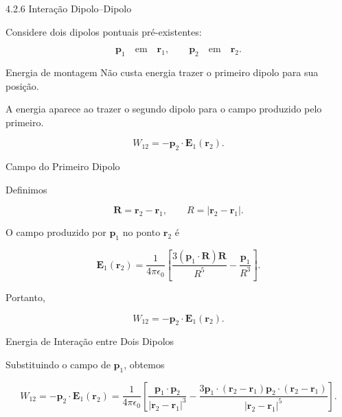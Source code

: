 \documentclass[aspectratio=169]{beamer}
\begin{document}
\begin{frame}{4.2.6 Interação Dipolo--Dipolo}

Considere dois dipolos pontuais pré-existentes:

\[
\mathbf p_1 \quad \text{em} \quad \mathbf r_1,
\qquad
\mathbf p_2 \quad \text{em} \quad \mathbf r_2.
\]

\begin{mybox}{Energia de montagem}
Não custa energia trazer o primeiro dipolo para sua posição.

A energia aparece ao trazer o segundo dipolo para o campo produzido pelo primeiro.
\end{mybox}

\begin{equation}
W_{12}
=
-\mathbf p_2\cdot \mathbf E_1(\mathbf r_2).
\end{equation}

\end{frame}

\begin{frame}{Campo do Primeiro Dipolo}

Definimos

\begin{equation}
\mathbf R
=
\mathbf r_2-\mathbf r_1,
\qquad
R=
|\mathbf r_2-\mathbf r_1|.
\end{equation}

O campo produzido por \(\mathbf p_1\) no ponto \(\mathbf r_2\) é

\begin{equation}
\mathbf E_1(\mathbf r_2)
=
\frac{1}{4\pi\epsilon_0}
\left[
\frac{3(\mathbf p_1\cdot \mathbf R)\mathbf R}{R^5}
-
\frac{\mathbf p_1}{R^3}
\right].
\end{equation}

Portanto,

\begin{equation}
W_{12}
=
-\mathbf p_2\cdot \mathbf E_1(\mathbf r_2).
\end{equation}

\end{frame}

\begin{frame}{Energia de Interação entre Dois Dipolos}

Substituindo o campo de \(\mathbf p_1\), obtemos

\begin{eqbox}
\begin{equation}
W_{12}
=
-\mathbf p_2\cdot \mathbf E_1(\mathbf r_2)
=
\frac{1}{4\pi\epsilon_0}
\left[
\frac{\mathbf p_1\cdot \mathbf p_2}{|\mathbf r_2-\mathbf r_1|^3}
-
\frac{
3\mathbf p_1\cdot(\mathbf r_2-\mathbf r_1)
\mathbf p_2\cdot(\mathbf r_2-\mathbf r_1)
}
{|\mathbf r_2-\mathbf r_1|^5}
\right].
\tag{4.30}
\label{eq:4.30}
\end{equation}
\end{eqbox}

\end{frame}
\end{document}
